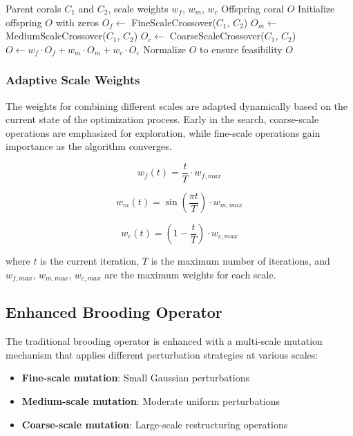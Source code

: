 \begin{algorithm}[htbp]
\caption{Inception-Based Reproduction Operator}
\label{alg:inception_crossover}
\begin{algorithmic}[1]
\REQUIRE Parent corals $C_1$ and $C_2$, scale weights $w_f$, $w_m$, $w_c$
\ENSURE Offspring coral $O$
\STATE Initialize offspring $O$ with zeros
\STATE $O_f \leftarrow$ FineScaleCrossover($C_1$, $C_2$)
\STATE $O_m \leftarrow$ MediumScaleCrossover($C_1$, $C_2$)
\STATE $O_c \leftarrow$ CoarseScaleCrossover($C_1$, $C_2$)
\STATE $O \leftarrow w_f \cdot O_f + w_m \cdot O_m + w_c \cdot O_c$
\STATE Normalize $O$ to ensure feasibility
\RETURN $O$
\end{algorithmic}
\end{algorithm}

\subsubsection{Adaptive Scale Weights}

The weights for combining different scales are adapted dynamically based on the current state of the optimization process. Early in the search, coarse-scale operations are emphasized for exploration, while fine-scale operations gain importance as the algorithm converges.

\begin{equation}
w_f(t) = \frac{t}{T} \cdot w_{f,max}
\end{equation}

\begin{equation}
w_m(t) = \sin\left(\frac{\pi t}{T}\right) \cdot w_{m,max}
\end{equation}

\begin{equation}
w_c(t) = \left(1 - \frac{t}{T}\right) \cdot w_{c,max}
\end{equation}

where $t$ is the current iteration, $T$ is the maximum number of iterations, and $w_{f,max}$, $w_{m,max}$, $w_{c,max}$ are the maximum weights for each scale.

\subsection{Enhanced Brooding Operator}

The traditional brooding operator is enhanced with a multi-scale mutation mechanism that applies different perturbation strategies at various scales:

\begin{itemize}
    \item \textbf{Fine-scale mutation}: Small Gaussian perturbations
    \item \textbf{Medium-scale mutation}: Moderate uniform perturbations
    \item \textbf{Coarse-scale mutation}: Large-scale restructuring operations
\end{itemize}

